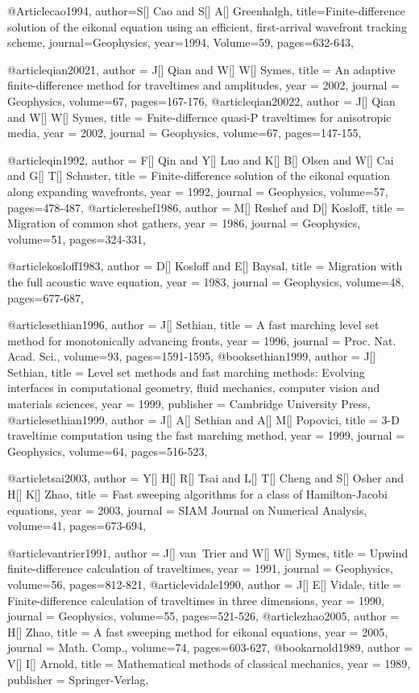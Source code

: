 @Article{cao1994,
  author={S[] Cao and S[] A[] Greenhalgh},
  title={Finite-difference solution of the eikonal equation using an efficient, first-arrival wavefront tracking scheme},
  journal={Geophysics},
  year=1994,
  Volume=59,
  pages={632-643},
}

@article{qian20021,
  author =	 {J[] Qian and W[] W[] Symes},
  title =	 {An adaptive finite-difference method for traveltimes and amplitudes},
  year =	 2002,
  journal =	 {Geophysics},
  volume={67},
 pages=167-176,
}
@article{qian20022,
  author =	 {J[] Qian and W[] W[] Symes},
  title =	 {Fnite-differnce quasi-P traveltimes for anisotropic media},
  year =	 2002,
  journal =	 {Geophysics},
  volume={67},
 pages=147-155,
}

@article{qin1992,
  author =	 {F[] Qin and Y[] Luo and K[] B[] Olsen and W[] Cai and G[] T[] Schuster},
  title =	 {Finite-difference solution of the eikonal equation along expanding wavefronts},
  year =	 1992,
  journal =	 {Geophysics},
  volume={57},
 pages=478-487,
}
@article{reshef1986,
  author =	 {M[] Reshef and D[] Kosloff},
  title =	 {Migration of common shot gathers},
  year =	 1986,
  journal =	 {Geophysics},
  volume={51},
 pages=324-331,
}

@article{kosloff1983,
  author =	 {D[] Kosloff and E[] Baysal},
  title =	 {Migration with the full acoustic wave equation},
  year =	 1983,
  journal =	 {Geophysics},
  volume={48},
 pages=677-687,
}

@article{sethian1996,
  author =	 {J[] Sethian},
  title =	 {A fast marching level set method for monotonically advancing fronts},
  year =	 1996,
  journal =	 {Proc. Nat. Acad. Sci.},
  volume={93},
 pages=1591-1595,
}
@book{sethian1999,
  author =	 {J[] Sethian},
  title =	 {Level set methods and fast marching methods: Evolving interfaces in computational geometry, fluid mechanics, computer vision and materials sciences},
  year =	 1999,
  publisher =	 {Cambridge University Press},
}
@article{sethian1999,
  author =	 {J[] A[] Sethian and A[] M[] Popovici},
  title =	 {3-D traveltime computation using the fast marching method},
  year =	 1999,
  journal =	 {Geophysics},
  volume={64},
 pages=516-523,
}

@article{tsai2003,
  author =	 {Y[] H[] R[] Tsai and L[] T[] Cheng and S[] Osher and H[] K[] Zhao},
  title =	 {Fast sweeping algorithms for a class of Hamilton-Jacobi equations},
  year =	 2003,
  journal =	 {SIAM Journal on Numerical Analysis},
  volume={41},
 pages=673-694,
}

@article{vantrier1991,
  author =	 {J[] van~Trier and W[] W[] Symes},
  title =	 {Upwind finite-difference calculation of traveltimes},
  year =	 1991,
  journal =	 {Geophysics},
  volume={56},
 pages=812-821,
}
@article{vidale1990,
  author =	 {J[] E[] Vidale},
  title =	 {Finite-difference calculation of traveltimes in three dimensions},
  year =	 1990,
  journal =	 {Geophysics},
  volume={55},
 pages=521-526,
}
@article{zhao2005,
  author =	 {H[] Zhao},
  title =	 {A fast sweeping method for eikonal equations},
  year =	 2005,
  journal =	 {Math. Comp.},
  volume={74},
 pages=603-627,
}
@book{arnold1989,
  author =	 {V[] I[] Arnold},
  title =	 {Mathematical methods of classical mechanics},
  year =	 1989,
  publisher =	 {Springer-Verlag},
}

